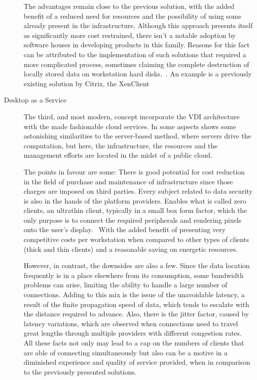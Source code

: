 \begin{description}
		The advantages remain close to the previous solution, with the added benefit of a reduced need for resources and the possibility of using some already present in the infrastructure. Although this approach presents itself as significantly more cost restrained, there isn't a notable adoption by software houses in developing products in this family. Reasons for this fact can be attributed to the implementation of such solutions that required a more complicated process, sometimes claiming the complete destruction of locally stored data on workstation hard disks.~\cite{VMblog_Citrix}. An example is a previously existing solution by Citrix, the XenClient~\cite{Citrix_XenDesktop}
	\item [Desktop as a Service] The third, and most modern, concept incorporate the VDI architecture with the made fashionable cloud services. In some aspects shows some astonishing similarities to the server-based method, where servers drive the computation, but here, the infrastructure, the resources and the management efforts are located in the midst of a public cloud.

		The points in favour are some: There is good potential for cost reduction in the field of purchase and maintenance of infrastructure since those charges are imposed on third parties. Every subject related to data security is also in the hands of the platform providers. Enables what is called zero clients, an ultrathin client, typically in a small box form factor, which the only purpose is to connect the required peripherals and rendering pixels onto the user’s display.~\cite{VMWare_Zikmund2014} With the added benefit of presenting very competitive costs per workstation when compared to other types of clients (thick and thin clients) and a reasonable saving on energetic resources.

		However, in contrast, the downsides are also a few. Since the data location frequently is in a place elsewhere from its consumption, some bandwidth problems can arise, limiting the ability to handle a large number of connections. Adding to this mix is the issue of the unavoidable latency, a result of the finite propagation speed of data, which tends to escalate with the distance required to advance. Also, there is the jitter factor, caused by latency variations, which are observed when connections need to travel great lengths through multiple providers with different congestion rates. All these facts not only may lead to a cap on the numbers of clients that are able of connecting simultaneously but also can be a motive in a diminished experience and quality of service provided, when in comparison to the previously presented solutions.
		

\end{description}
